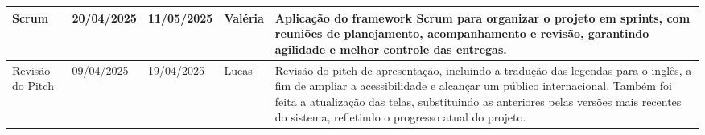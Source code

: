 \begin{center}
\begin{adjustbox}{max width=\textwidth}
\begin{tabular}{|m{4cm}|m{2.2cm}|m{2.2cm}|m{3cm}|m{8cm}|}
Scrum & 20/04/2025 & 11/05/2025 & Valéria &
Aplicação do framework Scrum para organizar o projeto em sprints, com reuniões de planejamento, acompanhamento e revisão, garantindo agilidade e melhor controle das entregas. \\ \hline

Revisão do Pitch & 09/04/2025 & 19/04/2025 & Lucas &
Revisão do pitch de apresentação, incluindo a tradução das legendas para o inglês, a fim de ampliar a acessibilidade e alcançar um público internacional. Também foi feita a atualização das telas, substituindo as anteriores pelas versões mais recentes do sistema, refletindo o progresso atual do projeto. \\ \hline

\end{tabular}
\end{adjustbox}

\vspace{0.3em}

\end{center}
